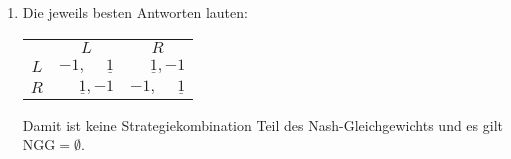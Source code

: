 \begin{enumerate}
\begin{description}
      \item[$x=2$:] Die besten Antworten lauten:
        \begin{center}
          \begin{tabular}{ccc}
            & $A$ & $B$\\
            \cmidrule{2-3}
            $U$ & $\underline{x},\underline{2}$ & $2,0$\\
            \cmidrule{2-3}
            $D$ & $\underline{2},1$ & $\underline{4},\underline{2}$\\
            \cmidrule{2-3}
          \end{tabular}
        \end{center}
        Damit gilt: $\text{NGG} = \{(U, A), (D,B)\}$.

      \item[$x>2$:] Die besten Antworten lauten:
        \begin{center}
          \begin{tabular}{ccc}
            & $A$ & $B$\\
            \cmidrule{2-3}
            $U$ & $\underline{x},\underline{2}$ & $2,0$\\
            \cmidrule{2-3}
            $D$ & $2,1$ & $\underline{4},\underline{2}$\\
            \cmidrule{2-3}
          \end{tabular}
        \end{center}
        Damit gilt wie im Fall $x=2$: $\text{NGG} = \{(U, A), (D,B)\}$.
    \end{description}

  \item Die jeweils besten Antworten lauten:
    \begin{center}
      \begin{tabular}{ccc}
        & $L$ & $R$\\
        \cmidrule{2-3}
        $L$ & $-1, \phantom{-}\underline{1}$ & $\phantom{-}\underline{1}, -1$\\
        \cmidrule{2-3}
        $R$ & $\phantom{-}\underline{1}, -1$ & $-1, \phantom{-}\underline{1}$\\
        \cmidrule{2-3}
      \end{tabular}
    \end{center}

    Damit ist keine Strategiekombination Teil des Nash-Gleichgewichts und es gilt
    $\text{NGG} = \emptyset$.
\end{enumerate}


